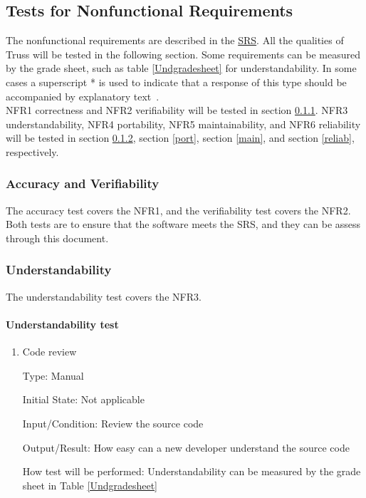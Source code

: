 \documentclass[12pt, titlepage]{article}
\begin{document}
\subsection{Tests for Nonfunctional Requirements} \label{testnfr}
The nonfunctional requirements are described in the 
\href{https://github.com/tingyuw/cas741/blob/master/docs/SRS/SRS.pdf}{SRS}. All 
the qualities of Truss will be tested in the following section. Some 
requirements can be measured by the grade sheet, such as table 
\ref{Undgradesheet} for understandability. In some cases a superscript * is 
used to indicate that a response of this type should be accompanied by 
explanatory text~\cite{Smithetal2018}.\\
NFR1 correctness and NFR2 verifiability will be tested in section \ref{candv}. 
NFR3 understandability, NFR4 portability, NFR5 maintainability, and NFR6 
reliability will be tested in section \ref{under}, section \ref{port}, section 
\ref{main}, and section \ref{reliab}, respectively.


\subsubsection{Accuracy and Verifiability} \label{candv}
The accuracy test covers the NFR1, and the verifiability test covers the
NFR2. Both tests are to ensure that the software meets the SRS, and they can 
be assess through this document.
		
\subsubsection{Understandability} \label{under}
The understandability test covers the NFR3.
\paragraph{Understandability test}

\begin{enumerate}

\item{Code review\\}

Type: Manual
					
Initial State: Not applicable
					
Input/Condition: Review the source code
					
Output/Result: How easy can a new developer understand the source code
					
How test will be performed: Understandability can be measured by the grade 
sheet in Table \ref{Undgradesheet}

\end{enumerate}
\end{document}
